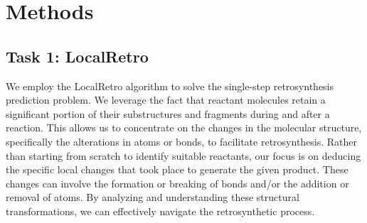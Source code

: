 \documentclass{article}
\begin{document}



\section{Methods}

\subsection{Task 1: LocalRetro}

We employ the LocalRetro algorithm to solve the single-step retrosynthesis prediction problem. We leverage the fact that reactant molecules retain a significant portion of their substructures and fragments during and after a reaction. This allows us to concentrate on the changes in the molecular structure, specifically the alterations in atoms or bonds, to facilitate retrosynthesis. Rather than starting from scratch to identify suitable reactants, our focus is on deducing the specific local changes that took place to generate the given product. These changes can involve the formation or breaking of bonds and/or the addition or removal of atoms. By analyzing and understanding these structural transformations, we can effectively navigate the retrosynthetic process.
\end{document}

